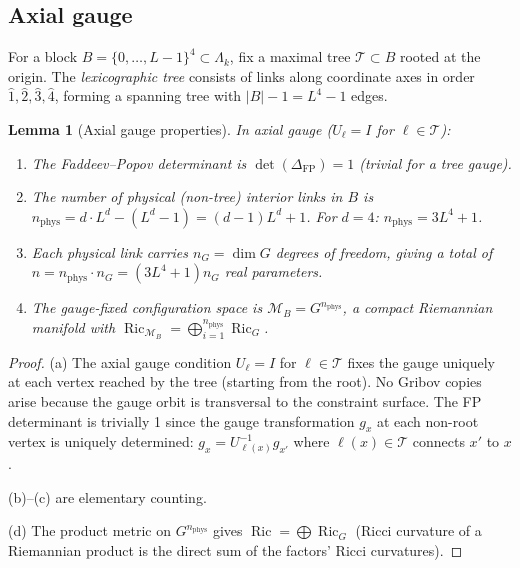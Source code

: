 \documentclass[11pt,a4paper]{article}
\theoremstyle{plain}
\newtheorem{lemma}[theorem]{Lemma}
\theoremstyle{definition}
\theoremstyle{remark}
\newcommand{\Ric}{\operatorname{Ric}}
\newcommand{\cM}{\mathcal{M}}
\newcommand{\cT}{\mathcal{T}}
\begin{document}
\subsection{Axial gauge}\label{ssec:axial}

For a block $B = \{0,\ldots,L-1\}^4 \subset \Lambda_k$,
fix a maximal tree $\cT \subset B$ rooted at the origin.
The \emph{lexicographic tree} consists of links along
coordinate axes in order $\hat{1}, \hat{2}, \hat{3}, \hat{4}$,
forming a spanning tree with $|B| - 1 = L^4 - 1$ edges.

\begin{lemma}[Axial gauge properties]\label{lem:axial}
In axial gauge ($U_\ell = I$ for $\ell \in \cT$):
\begin{enumerate}[label=\textup{(\alph*)},nosep]
  \item The Faddeev--Popov determinant is $\det(\Delta_{\mathrm{FP}}) = 1$
    (trivial for a tree gauge).
  \item The number of physical (non-tree) interior links
    in $B$ is $n_{\mathrm{phys}} = d \cdot L^d - (L^d - 1)
    = (d-1)L^d + 1$. For $d = 4$: $n_{\mathrm{phys}} = 3L^4 + 1$.
  \item Each physical link carries $n_G = \dim G$ degrees
    of freedom, giving a total of
    $n = n_{\mathrm{phys}} \cdot n_G = (3L^4+1)n_G$
    real parameters.
  \item The gauge-fixed configuration space is
    $\cM_B = G^{n_{\mathrm{phys}}}$, a compact Riemannian
    manifold with $\Ric_{\cM_B} = \bigoplus_{i=1}^{n_{\mathrm{phys}}}
    \Ric_G$.
\end{enumerate}
\end{lemma}

\begin{proof}
(a) The axial gauge condition $U_\ell = I$ for
$\ell \in \cT$ fixes the gauge uniquely at each vertex
reached by the tree (starting from the root). No
Gribov copies arise because the gauge orbit is
transversal to the constraint surface. The FP
determinant is trivially 1 since the gauge
transformation $g_x$ at each non-root vertex is
uniquely determined: $g_x = U_{\ell(x)}^{-1}
g_{x'}$ where $\ell(x) \in \cT$ connects $x'$ to $x$.

(b)--(c) are elementary counting.

(d) The product metric on $G^{n_{\mathrm{phys}}}$ gives
$\Ric = \bigoplus \Ric_G$ (Ricci curvature of a Riemannian
product is the direct sum of the factors' Ricci curvatures).
\end{proof}
\end{document}
